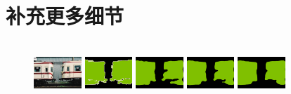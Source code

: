 \chapter{补充更多细节}

\begin{figure}[h!]
\centering
		 \\
		\includegraphics[width=0.16\textwidth]{image/appendix1/2007_000042.jpg}
		\includegraphics[width=0.16\textwidth]{image/appendix1/2007_000042.png}
		\includegraphics[width=0.16\textwidth]{image/appendix1/1/2007_000042.png} 
		\includegraphics[width=0.16\textwidth]{image/appendix1/3/2007_000042.png}
		\includegraphics[width=0.16\textwidth]{image/appendix1/5/2007_000042.png} \\


\end{figure}
